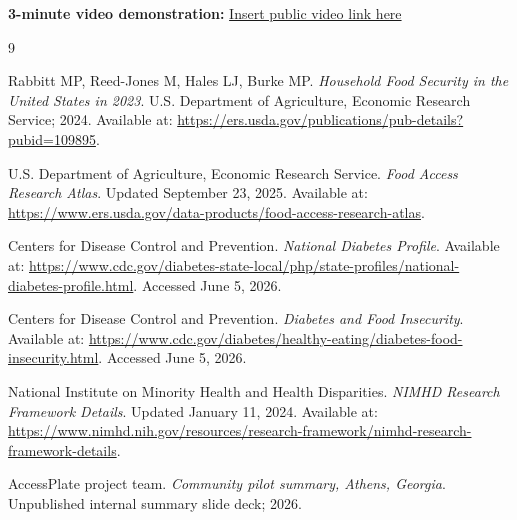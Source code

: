 \documentclass[11pt,letterpaper]{article}
\newcommand{\tight}[1]{\vspace{#1}}
\begin{document}
\tight{0.3em}
\textbf{3-minute video demonstration:} \href{https://YOUR-VIDEO-LINK-HERE}{Insert public video link here}

\begin{thebibliography}{9}
\small

Rabbitt MP, Reed-Jones M, Hales LJ, Burke MP.
\newblock \emph{Household Food Security in the United States in 2023}.
\newblock U.S. Department of Agriculture, Economic Research Service; 2024.
\newblock Available at: \href{https://ers.usda.gov/publications/pub-details?pubid=109895}{https://ers.usda.gov/publications/pub-details?pubid=109895}.

U.S. Department of Agriculture, Economic Research Service.
\newblock \emph{Food Access Research Atlas}.
\newblock Updated September 23, 2025.
\newblock Available at: \href{https://www.ers.usda.gov/data-products/food-access-research-atlas}{https://www.ers.usda.gov/data-products/food-access-research-atlas}.

Centers for Disease Control and Prevention.
\newblock \emph{National Diabetes Profile}.
\newblock Available at: \href{https://www.cdc.gov/diabetes-state-local/php/state-profiles/national-diabetes-profile.html}{https://www.cdc.gov/diabetes-state-local/php/state-profiles/national-diabetes-profile.html}.
\newblock Accessed June 5, 2026.

Centers for Disease Control and Prevention.
\newblock \emph{Diabetes and Food Insecurity}.
\newblock Available at: \href{https://www.cdc.gov/diabetes/healthy-eating/diabetes-food-insecurity.html}{https://www.cdc.gov/diabetes/healthy-eating/diabetes-food-insecurity.html}.
\newblock Accessed June 5, 2026.

National Institute on Minority Health and Health Disparities.
\newblock \emph{NIMHD Research Framework Details}.
\newblock Updated January 11, 2024.
\newblock Available at: \href{https://www.nimhd.nih.gov/resources/research-framework/nimhd-research-framework-details}{https://www.nimhd.nih.gov/resources/research-framework/nimhd-research-framework-details}.

AccessPlate project team.
\newblock \emph{Community pilot summary, Athens, Georgia}.
\newblock Unpublished internal summary slide deck; 2026.

\end{thebibliography}
\end{document}

